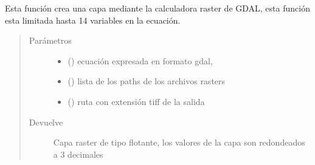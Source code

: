 \documentclass[letterpaper,10pt,spanish]{sphinxmanual}
\begin{document}
\begin{fulllineitems}
\label{\detokenize{apcsig:apcsig.crea_capa_raster}}
Esta función crea una capa mediante la calculadora raster
de GDAL, esta función esta limitada hasta 14 variables en la ecuación.
\begin{quote}\begin{description}
\item[{Parámetros}] \leavevmode\begin{itemize}
\item {} 
 () \textendash{} ecuación expresada en formato gdal,

\item {} 
 () \textendash{} lista de los paths de los archivos rasters

\item {} 
 () \textendash{} ruta con extensión tiff de la salida

\end{itemize}

\item[{Devuelve}] \leavevmode
Capa raster de tipo flotante, los valores de la capa son redondeados a 3 decimales

\end{description}\end{quote}

\end{fulllineitems}

\end{document}

